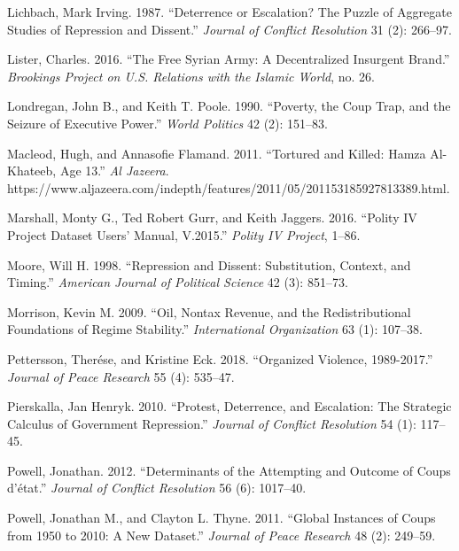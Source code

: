 \documentclass[12pt,]{article}
\theoremstyle{definition}
\theoremstyle{definition}
\theoremstyle{definition}
\theoremstyle{remark}
\begin{document}
\leavevmode\hypertarget{ref-Lichbach1987}{}%
Lichbach, Mark Irving. 1987. ``Deterrence or Escalation? The Puzzle of
Aggregate Studies of Repression and Dissent.'' \emph{Journal of Conflict
Resolution} 31 (2): 266--97.

\leavevmode\hypertarget{ref-Lister2016}{}%
Lister, Charles. 2016. ``The Free Syrian Army: A Decentralized Insurgent
Brand.'' \emph{Brookings Project on U.S. Relations with the Islamic
World}, no. 26.

\leavevmode\hypertarget{ref-Londregan1990}{}%
Londregan, John B., and Keith T. Poole. 1990. ``Poverty, the Coup Trap,
and the Seizure of Executive Power.'' \emph{World Politics} 42 (2):
151--83.

\leavevmode\hypertarget{ref-Macleod2011}{}%
Macleod, Hugh, and Annasofie Flamand. 2011. ``Tortured and Killed: Hamza
Al-Khateeb, Age 13.'' \emph{Al Jazeera}.
https://www.aljazeera.com/indepth/features/2011/05/201153185927813389.html.

\leavevmode\hypertarget{ref-Marshall2016}{}%
Marshall, Monty G., Ted Robert Gurr, and Keith Jaggers. 2016. ``Polity
IV Project Dataset Users' Manual, V.2015.'' \emph{Polity IV Project},
1--86.

\leavevmode\hypertarget{ref-Moore1998}{}%
Moore, Will H. 1998. ``Repression and Dissent: Substitution, Context,
and Timing.'' \emph{American Journal of Political Science} 42 (3):
851--73.

\leavevmode\hypertarget{ref-Morrison2009}{}%
Morrison, Kevin M. 2009. ``Oil, Nontax Revenue, and the Redistributional
Foundations of Regime Stability.'' \emph{International Organization} 63
(1): 107--38.

\leavevmode\hypertarget{ref-Pettersson2018}{}%
Pettersson, Therése, and Kristine Eck. 2018. ``Organized Violence,
1989-2017.'' \emph{Journal of Peace Research} 55 (4): 535--47.

\leavevmode\hypertarget{ref-Pierskalla2010}{}%
Pierskalla, Jan Henryk. 2010. ``Protest, Deterrence, and Escalation: The
Strategic Calculus of Government Repression.'' \emph{Journal of Conflict
Resolution} 54 (1): 117--45.

\leavevmode\hypertarget{ref-Powell2012a}{}%
Powell, Jonathan. 2012. ``Determinants of the Attempting and Outcome of
Coups d'état.'' \emph{Journal of Conflict Resolution} 56 (6): 1017--40.

\leavevmode\hypertarget{ref-Powell2011}{}%
Powell, Jonathan M., and Clayton L. Thyne. 2011. ``Global Instances of
Coups from 1950 to 2010: A New Dataset.'' \emph{Journal of Peace
Research} 48 (2): 249--59.
\end{document}
